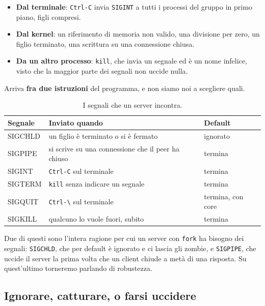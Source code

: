 
\begin{itemize}
    \item \textbf{Dal terminale}: \texttt{Ctrl-C} invia \texttt{SIGINT} a tutti i processi del gruppo in primo piano, figli
          compresi.
    \item \textbf{Dal kernel}: un riferimento di memoria non valido, una divisione per zero, un figlio terminato, una
          scrittura su una connessione chiusa.
    \item \textbf{Da un altro processo}: \texttt{kill}, che invia un segnale ed è un nome infelice, visto che la maggior
          parte dei segnali non uccide nulla.
\end{itemize}
Arriva \textbf{fra due istruzioni} del programma, e non siamo noi a scegliere quali.

\begin{table}[H]
\centering
\begin{tabular}{>{\ttfamily}l l l}
\toprule
\normalfont\textbf{Segnale} & \textbf{Inviato quando} & \textbf{Default} \\
\midrule
SIGCHLD & un figlio è terminato o si è fermato & ignorato \\
SIGPIPE & si scrive su una connessione che il peer ha chiuso & termina \\
SIGINT  & \texttt{Ctrl-C} sul terminale & termina \\
SIGTERM & \texttt{kill} senza indicare un segnale & termina \\
SIGQUIT & \texttt{Ctrl-\textbackslash} sul terminale & termina, con core \\
SIGKILL & qualcuno lo vuole fuori, subito & termina \\
\bottomrule
\end{tabular}
\caption{I segnali che un server incontra.}
\end{table}

Due di questi sono l'intera ragione per cui un server con \texttt{fork} ha bisogno dei segnali: \texttt{SIGCHLD}, che per
default è ignorato e ci lascia gli zombie, e \texttt{SIGPIPE}, che uccide il server la prima volta che un client chiude a
metà di una risposta. Su quest'ultimo torneremo parlando di robustezza.

\subsection{Ignorare, catturare, o farsi uccidere}

